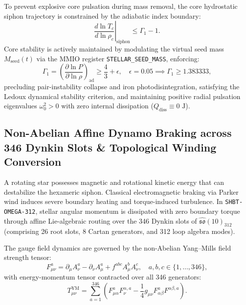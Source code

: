 \documentclass[11pt,onecolumn]{article}
\begin{document}
To prevent explosive core pulsation during mass removal, the core hydrostatic siphon trajectory is constrained by the adiabatic index boundary:
\begin{equation}
\left. \frac{d\ln T_c}{d\ln \rho_c} \right|_{\text{siphon}} \le \Gamma_1 - 1.
\label{eq:hydrostatic_siphon_constraint}
\end{equation}
Core stability is actively maintained by modulating the virtual seed mass $M_{\text{seed}}(t)$ via the MMIO register \texttt{STELLAR\_SEED\_MASS}, enforcing:
\begin{equation}
\Gamma_1 = \left( \frac{\partial \ln P}{\partial \ln \rho} \right)_{\text{ad}} \ge \frac{4}{3} + \epsilon, \quad \epsilon = 0.05 \implies \Gamma_1 \ge 1.383333,
\end{equation}
precluding pair-instability collapse and iron photodisintegration, satisfying the Ledoux dynamical stability criterion, and maintaining positive radial pulsation eigenvalues $\omega_0^2 > 0$ with zero internal dissipation ($Q_{\text{diss}} \equiv 0\text{ J}$).

\subsection{Non-Abelian Affine Dynamo Braking across 346 Dynkin Slots \& Topological Winding Conversion}
\label{sec:omega_dynamo_braking}

A rotating star possesses magnetic and rotational kinetic energy that can destabilize the hexameric siphon. Classical electromagnetic braking via Parker wind induces severe boundary heating and torque-induced turbulence. In \texttt{SHBT-OMEGA-312}, stellar angular momentum is dissipated with zero boundary torque through affine Lie-algebraic routing over the 346 Dynkin slots of $\hat{\mathfrak{so}}(10)_{312}$ (comprising 26 root slots, 8 Cartan generators, and 312 loop algebra modes).

The gauge field dynamics are governed by the non-Abelian Yang--Mills field strength tensor:
\begin{equation}
F_{\mu\nu}^a = \partial_\mu A_\nu^a - \partial_\nu A_\mu^a + f^{abc} A_\mu^b A_\nu^c, \quad a,b,c \in \{1, \dots, 346\},
\label{eq:ym_dynkin_field_strength}
\end{equation}
with energy-momentum tensor contracted over all 346 generators:
\begin{equation}
T_{\mu\nu}^{\text{YM}} = \sum_{a=1}^{346} \left( F_{\mu\alpha}^a F_\nu^{\alpha, a} - \frac{1}{4} g_{\mu\nu} F_{\alpha\beta}^a F^{\alpha\beta, a} \right).
\end{equation}
\end{document}
